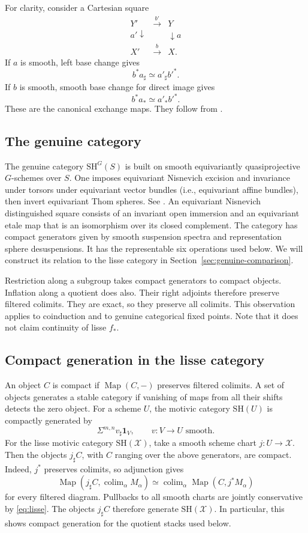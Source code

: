 \documentclass[11pt,reqno]{amsart}
\theoremstyle{definition}
\theoremstyle{remark}
\theoremstyle{plain}
\numberwithin{equation}{section}
\newcommand{\SH}{\mathrm{SH}}
\newcommand{\one}{\mathbf 1}
\DeclareMathOperator{\Map}{Map}
\DeclareMathOperator*{\colim}{colim}
\newcommand{\X}{\mathcal X}
\begin{document}
For clarity, consider a Cartesian square
\begin{equation}\label{eq:bc-square}
\begin{array}{ccc}
 Y'&\xrightarrow{b'}&Y\\
 {\scriptstyle a'}\downarrow&&\downarrow{\scriptstyle a}\\
 X'&\xrightarrow{b}&X .
\end{array}
\end{equation}
If \(a\) is smooth, left base change gives
\[
 b^*a_\sharp\simeq a'_\sharp b'^*.
\]
If \(b\) is smooth, smooth base change for direct image gives
\[
 b^*a_*\simeq a'_*b'^*.
\]
These are the canonical exchange maps.
They follow from \cite[Proposition~C.1(iii)]{ChowdhuryDAngelo}.

\subsection{The genuine category}
The genuine category \(\SH^G(S)\) is built on smooth equivariantly
quasiprojective \(G\)-schemes over \(S\).
One imposes equivariant Nisnevich excision and invariance under torsors
under equivariant vector bundles (i.e., equivariant affine bundles), 
then invert equivariant Thom spheres. See \cite[Sections~3 and 6]{Hoyois}.
An equivariant Nisnevich distinguished square consists of an invariant
open immersion and an equivariant etale map that is an isomorphism
over its closed complement.
The category has compact generators given by smooth suspension spectra
and representation sphere desuspensions.
It has the representable six operations used below.
We will construct its relation to the lisse category in
Section~\ref{sec:genuine-comparison}.

Restriction along a subgroup takes compact generators to compact objects.
Inflation along a quotient does also.
Their right adjoints therefore preserve filtered colimits.
They are exact, so they preserve all colimits.
This observation applies to coinduction and to genuine categorical
fixed points. Note that it does not claim continuity of lisse \(f_*\).

\subsection{Compact generation in the lisse category}
An object \(C\) is compact if \(\Map(C,-)\) preserves filtered colimits.
A set of objects generates a stable category if vanishing of maps from
all their shifts detects the zero object.
For a scheme \(U\), the motivic category \(\SH(U)\) is compactly generated by
\[
 \Sigma^{m,n}v_\sharp\one_V,\qquad v:V\to U\text{ smooth}.
\]
For the lisse motivic category \(\SH(\X)\), take a smooth scheme chart \(j:U\to\X\). 
Then the objects \(j_\sharp C\), with \(C\) ranging over the above generators, are compact.
Indeed, \(j^*\) preserves colimits, so adjunction gives
\[
 \Map(j_\sharp C,\colim_\alpha M_\alpha)
 \simeq\colim_\alpha\Map(C,j^*M_\alpha)
\]
for every filtered diagram.
Pullbacks to all smooth charts are jointly conservative by \eqref{eq:lisse}.
The objects \(j_\sharp C\) therefore generate \(\SH(\X)\).
In particular, this shows compact generation for the quotient stacks used below.
\end{document}
